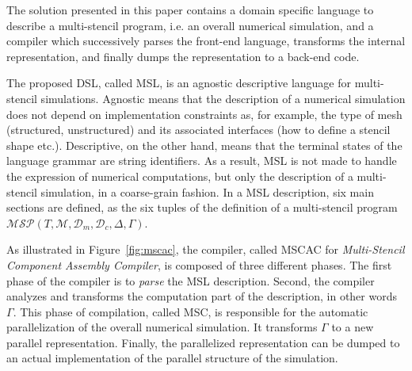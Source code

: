 The solution presented in this paper contains a domain specific language to describe a multi-stencil program, i.e. an overall numerical simulation, and a compiler which successively parses the front-end language, transforms the internal representation, and finally dumps the representation to a back-end code.

The proposed DSL, called MSL, is an agnostic descriptive language for multi-stencil simulations. Agnostic means that the description of a numerical simulation does not depend on implementation constraints as, for example, the type of mesh (structured, unstructured) and its associated interfaces (how to define a stencil shape etc.). Descriptive, on the other hand, means that the terminal states of the language grammar are string identifiers. As a result, MSL is not made to handle the expression of numerical computations, but only the description of a multi-stencil simulation, in a coarse-grain fashion. In a MSL description, six main sections are defined, as the six tuples of the definition of a multi-stencil program $\mathcal{MSP}(T,\mathcal{M},\mathcal{D}_m,\mathcal{D}_c,\Delta,\Gamma)$.

As illustrated in Figure~\ref{fig:mscac}, the compiler, called MSCAC for \emph{Multi-Stencil Component Assembly Compiler}, is composed of three different phases. The first phase of the compiler is to \emph{parse} the MSL description. Second, the compiler analyzes and transforms the computation part of the description, in other words $\Gamma$. This phase of compilation, called MSC, is responsible for the automatic parallelization of the overall numerical simulation. It transforms $\Gamma$ to a new parallel representation. Finally, the parallelized representation can be dumped to an actual implementation of the parallel structure of the simulation.

